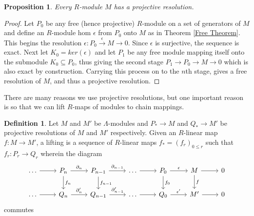 \documentclass[12pt]{book}
\newtheorem{proposition}[theorem]{Proposition}
\theoremstyle{definition}
\newtheorem{definition}[theorem]{Definition}
\begin{document}
\begin{proposition}
    Every $R$-module $M$ has a projective resolution. 
\end{proposition}
\begin{proof}
    Let $P_0$ be any free (hence projective) $R$-module on a set of generators of $M$ and define an $R$-module hom $\epsilon$ from $P_0$ onto $M$ as in Theorem \ref{Free Theorem}. This begins the resolution $\epsilon : P_0 \xrightarrow{\epsilon} M \rightarrow 0$. Since $\epsilon$ is surjective, the sequence is exact. Next let $K_0 = ker(\epsilon)$ and let $P_1$ be any free module mapping itself onto the submodule $K_0 \subseteq P_0$, thus giving the second stage $P_1 \rightarrow P_0 \rightarrow M \rightarrow 0$ which is also exact by construction. Carrying this process on to the $n$th stage, gives a free resolution of $M$, and thus a projective resolution.    
\end{proof}

There are many reasons we use projective resolutions, but one important reason is so that we can lift $R$-maps of modules to chain mappings.

\begin{definition}
    Let $M$ and $M'$ be $\Lambda$-modules and $P_* \rightarrow M$ and $Q_* \rightarrow M'$ be projective resolutions of $M$ and $M'$ respectively. Given an $R$-linear map $f : M \to M'$, a lifting is a sequence of $R$-linear maps $f_* = (f_r)_{0 \leq r}$ such that $f_r : P_r \to Q_r$ wherein the diagram 
    \[
    \begin{tikzcd}
    \dots \arrow[r] & P_n \arrow[r, "\partial_n"] \arrow[d, "f_n"] 
    & P_{n-1} \arrow[r, "\partial_{n-1}"] \arrow[d, "f_{n-1}"] 
    & \dots \arrow[r]
    & P_0 \arrow[r, "\epsilon"] \arrow[d, "f_0"]
    & M \arrow[r] \arrow[d, "f"]
    & 0 \\
    \dots \arrow[r] & Q_n \arrow[r, "\partial_n'"] 
    & Q_{n-1} \arrow[r, "\partial_{n-1}'"]
    & \dots \arrow[r]
    & Q_0 \arrow[r, "\epsilon'"]
    & M' \arrow[r] 
    & 0
    \end{tikzcd}
    \]
    commutes
\end{definition}
\end{document}
